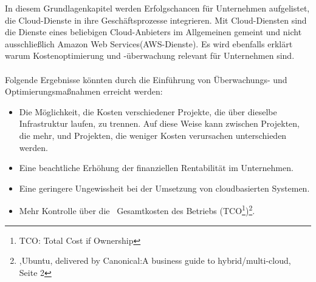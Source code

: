 In diesem Grundlagenkapitel werden Erfolgschancen für Unternehmen aufgelistet, die Cloud-Dienste in ihre Geschäftsprozesse integrieren. Mit Cloud-Diensten sind die Dienste eines beliebigen Cloud-Anbieters im Allgemeinen gemeint und nicht ausschließlich Amazon Web Services(AWS-Dienste). 
Es wird ebenfalls erklärt warum Kostenoptimierung und -überwachung relevant für Unternehmen sind.
\\\\
Folgende Ergebnisse könnten durch die Einführung von Überwachungs- und Optimierungsmaßnahmen erreicht werden:
\begin{itemize}
      \item
            Die Möglichkeit, die Kosten verschiedener Projekte, die über dieselbe Infrastruktur laufen, zu trennen.
            Auf diese Weise kann zwischen Projekten, die mehr, und Projekten, die weniger Kosten verursachen unterschieden werden.%
      \item
            Eine beachtliche Erhöhung der finanziellen Rentabilität im Unternehmen.%
      \item
            Eine geringere Ungewissheit bei der Umsetzung von cloudbasierten Systemen.
      \item
            Mehr Kontrolle über die  Gesamtkosten des Betriebs (TCO\footnote{TCO: Total Cost if Ownership})\footnote{\cite{CAN01},Ubuntu, delivered by Canonical:A business guide to hybrid/multi-cloud, Seite 2}.

\end{itemize}



